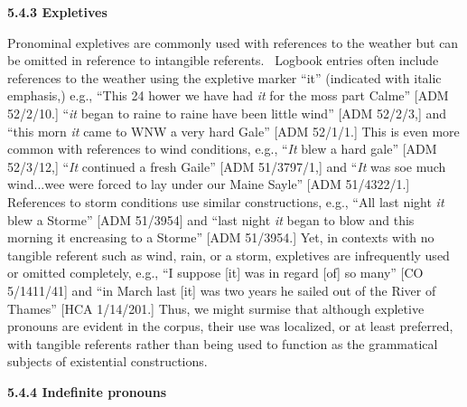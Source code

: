 \begin{styleStandard}
\textbf{5.4.3 Expletives}
\end{styleStandard}

\begin{styleStandard}
Pronominal expletives are commonly used with references to the weather but can be omitted in reference to intangible referents. \ Logbook entries often include references to the weather using the expletive marker “it” (indicated with italic emphasis,) e.g., “This 24 hower we have had \textit{it }for the moss part Calme” [ADM 52/2/10.] “\textit{it} began to raine to raine have been little wind” [ADM 52/2/3,] and “this morn \textit{it }came to WNW a very hard Gale” [ADM 52/1/1.] This is even more common with references to wind conditions, e.g., “\textit{It} blew a hard gale” [ADM 52/3/12,] “\textit{It} continued a fresh Gaile” [ADM 51/3797/1,] and “\textit{It} was soe much wind...wee were forced to lay under our Maine Sayle” [ADM 51/4322/1.] References to storm conditions use similar constructions, e.g., “All last night\textit{ it} blew a Storme” [ADM 51/3954] and “last night \textit{it }began to blow and this morning it encreasing to a Storme” [ADM 51/3954.] Yet, in contexts with no tangible referent such as wind, rain, or a storm, expletives are infrequently used or omitted completely, e.g., “I suppose [it] was in regard [of] so many” [CO 5/1411/41] and “in March last [it] was two years he sailed out of the River of Thames” [HCA 1/14/201.] Thus, we might surmise that although expletive pronouns are evident in the corpus, their use was localized, or at least preferred, with tangible referents rather than being used to function as the grammatical subjects of existential constructions.
\end{styleStandard}

\begin{styleStandard}
\textbf{5.4.4 Indefinite pronouns}
\end{styleStandard}

